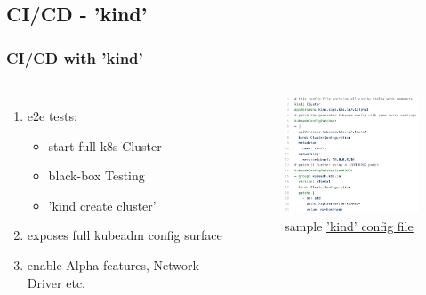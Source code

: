 \documentclass[default]{beamer}
\begin{document}
\subsection{CI/CD - 'kind'}
\begin{frame}
  \frametitle{CI/CD with 'kind'\footnotemark}
  \begin{columns}
    \column{2in}
    \begin{enumerate}
      \item e2e tests:
      \begin{itemize}
        \item start full k8s Cluster
        \item black-box Testing
        \item 'kind create cluster'
      \end{itemize}
      \item exposes full kubeadm config surface
      \item enable Alpha features, Network Driver etc.
    \end{enumerate}
    \column{2in}
    \begin{figure}
      \includegraphics[width=130pt,height=100pt]{src/kubecon/static/kind.png}
      \caption{sample \href{https://github.com/kubernetes-sigs/kind/blob/master/site/content/docs/user/kind-example-config.yaml}{'kind' config file}}
    \end{figure}
  \end{columns}
\end{frame}
\end{document}
